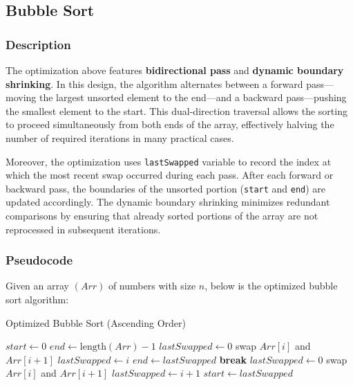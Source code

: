 \subsection{ Bubble Sort }

\subsubsection{Description}

The optimization above features \textbf{bidirectional pass} and \textbf{dynamic boundary shrinking}. In this design, the algorithm alternates between a forward pass—moving the largest unsorted element to the end—and a backward pass—pushing the smallest element to the start. This dual-direction traversal allows the sorting to proceed simultaneously from both ends of the array, effectively halving the number of required iterations in many practical cases.

Moreover, the optimization uses \texttt{lastSwapped} variable to record the index at which the most recent swap occurred during each pass. After each forward or backward pass, the boundaries of the unsorted portion (\texttt{start} and \texttt{end}) are updated accordingly. The dynamic boundary shrinking minimizes redundant comparisons by ensuring that already sorted portions of the array are not reprocessed in subsequent iterations.

\subsubsection{Pseudocode}
Given an array $(Arr)$ of numbers with size $n$, below is the optimized bubble sort algorithm:

\begin{algorithm} [H]
    \caption{Optimized Bubble Sort (Ascending Order)}
    \begin{algorithmic}
        \State{} $start \gets 0$ 
        \State{} $end \gets \text{length}(Arr) - 1$ 
            \State{} $lastSwapped \gets 0$
                    \State{} swap $Arr[i]$ and $Arr[i + 1]$
                    \State{} $lastSwapped \gets i$
                \EndIf{}
            \EndFor{}
            \State{} $end \gets lastSwapped$
                \State{} \textbf{break} 
            \EndIf{}
            \State{} $lastSwapped \gets 0$
                        \State{} swap $Arr[i]$ and $Arr[i + 1]$
                        \State{} $lastSwapped \gets i + 1$
                    \EndIf{}
                \EndFor{}
            \State{} $start \gets lastSwapped$
        \EndWhile{}
    \EndProcedure{}
\end{algorithmic}
\end{algorithm}

